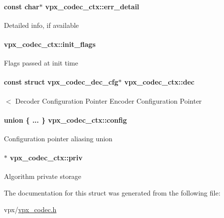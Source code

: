 \paragraph[{\texorpdfstring{err\+\_\+detail}{err_detail}}]{\setlength{\rightskip}{0pt plus 5cm}const char$\ast$ vpx\+\_\+codec\+\_\+ctx\+::err\+\_\+detail}\hypertarget{structvpx__codec__ctx_ad785c88ae862dd9129965c72723260bd}{}\label{structvpx__codec__ctx_ad785c88ae862dd9129965c72723260bd}
Detailed info, if available 
\paragraph[{\texorpdfstring{init\+\_\+flags}{init_flags}}]{ vpx\+\_\+codec\+\_\+ctx\+::init\+\_\+flags}\hypertarget{structvpx__codec__ctx_a76546548086c060a6bd21cb55037fb2b}{}\label{structvpx__codec__ctx_a76546548086c060a6bd21cb55037fb2b}
Flags passed at init time 
\paragraph[{\texorpdfstring{dec}{dec}}]{\setlength{\rightskip}{0pt plus 5cm}const struct {\bf vpx\+\_\+codec\+\_\+dec\+\_\+cfg}$\ast$ vpx\+\_\+codec\+\_\+ctx\+::dec}\hypertarget{structvpx__codec__ctx_a3033c08dd62713d56d875ea51575bd2b}{}\label{structvpx__codec__ctx_a3033c08dd62713d56d875ea51575bd2b}
$<$ Decoder Configuration Pointer Encoder Configuration Pointer 
\paragraph[{\texorpdfstring{config}{config}}]{\setlength{\rightskip}{0pt plus 5cm}union \{ ... \}                          vpx\+\_\+codec\+\_\+ctx\+::config}\hypertarget{structvpx__codec__ctx_aaa15a858376e55269a0a7ba5bff09f04}{}\label{structvpx__codec__ctx_aaa15a858376e55269a0a7ba5bff09f04}
Configuration pointer aliasing union 
\paragraph[{\texorpdfstring{priv}{priv}}]{$\ast$ vpx\+\_\+codec\+\_\+ctx\+::priv}\hypertarget{structvpx__codec__ctx_acee775fd5b7580e112e245ce39733f92}{}\label{structvpx__codec__ctx_acee775fd5b7580e112e245ce39733f92}
Algorithm private storage 

The documentation for this struct was generated from the following file\+:\begin{DoxyCompactItemize}
\item 
vpx/\hyperlink{vpx__codec_8h}{vpx\+\_\+codec.\+h}\end{DoxyCompactItemize}
